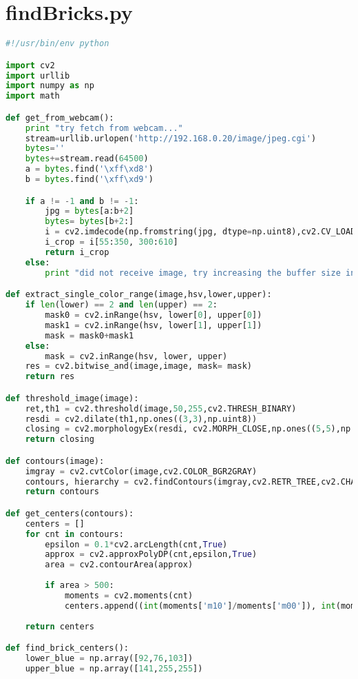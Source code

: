 \newpage
\section{findBricks.py}\label{sec:VisionFuntioner}
\begin{lstlisting}[language=Python]
#!/usr/bin/env python

import cv2
import urllib
import numpy as np
import math

def get_from_webcam():
    print "try fetch from webcam..."
    stream=urllib.urlopen('http://192.168.0.20/image/jpeg.cgi')
    bytes=''
    bytes+=stream.read(64500)
    a = bytes.find('\xff\xd8')
    b = bytes.find('\xff\xd9')

    if a != -1 and b != -1:
        jpg = bytes[a:b+2]
        bytes= bytes[b+2:]
        i = cv2.imdecode(np.fromstring(jpg, dtype=np.uint8),cv2.CV_LOAD_IMAGE_COLOR)
        i_crop = i[55:350, 300:610]
        return i_crop
    else:
        print "did not receive image, try increasing the buffer size in line 13:"

def extract_single_color_range(image,hsv,lower,upper):
    if len(lower) == 2 and len(upper) == 2:
        mask0 = cv2.inRange(hsv, lower[0], upper[0])
        mask1 = cv2.inRange(hsv, lower[1], upper[1])
        mask = mask0+mask1
    else:
        mask = cv2.inRange(hsv, lower, upper)
    res = cv2.bitwise_and(image,image, mask= mask)
    return res

def threshold_image(image):
    ret,th1 = cv2.threshold(image,50,255,cv2.THRESH_BINARY)
    resdi = cv2.dilate(th1,np.ones((3,3),np.uint8))
    closing = cv2.morphologyEx(resdi, cv2.MORPH_CLOSE,np.ones((5,5),np.uint8))
    return closing

def contours(image):
    imgray = cv2.cvtColor(image,cv2.COLOR_BGR2GRAY)
    contours, hierarchy = cv2.findContours(imgray,cv2.RETR_TREE,cv2.CHAIN_APPROX_SIMPLE)
    return contours

def get_centers(contours):
    centers = []
    for cnt in contours:
        epsilon = 0.1*cv2.arcLength(cnt,True)
        approx = cv2.approxPolyDP(cnt,epsilon,True)
        area = cv2.contourArea(approx)
        
        if area > 500:
            moments = cv2.moments(cnt)
            centers.append((int(moments['m10']/moments['m00']), int(moments['m01']/moments['m00'])))
    
    return centers

def find_brick_centers():    
    lower_blue = np.array([92,76,103])
    upper_blue = np.array([141,255,255])
    

\end{lstlisting}
